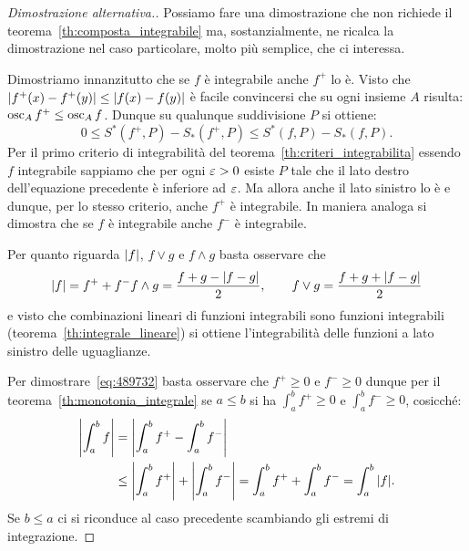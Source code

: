   \begin{proof}[Dimostrazione alternativa.]
  Possiamo fare una dimostrazione che non richiede 
  il teorema~\ref{th:composta_integrabile}
  ma, sostanzialmente, ne ricalca la dimostrazione nel 
  caso particolare, molto più semplice, che ci interessa.

  Dimostriamo innanzitutto che se $f$ è integrabile anche $f^+$ lo è.
  Visto che ${\left|f^+(x)-f^+(y)\right|}\le {\left|f(x)-f(y)\right|}$ 
  è facile convincersi che su ogni insieme $A$ risulta: 
  $\operatorname{osc}_A f^+ \le \operatorname{osc}_A f$.
  Dunque su qualunque suddivisione $P$
  si ottiene:
  \[
    0 \le S^*(f^+,P) - S_*(f^+,P) \le S^*(f,P) - S_*(f,P).
  \]
  Per il primo criterio di integrabilità del 
  teorema~\ref{th:criteri_integrabilita} essendo $f$ integrabile 
  sappiamo che per ogni $\varepsilon>0$ esiste $P$ tale che il lato 
  destro dell'equazione precedente è inferiore ad $\varepsilon$.
  Ma allora anche il lato sinistro lo è e dunque, 
  per lo stesso criterio, anche $f^+$ è integrabile.    
  In maniera analoga si dimostra che se $f$ è integrabile 
  anche $f^-$ è integrabile.
  
  Per quanto riguarda ${\left|f\right|}$, $f\vee g$ e $f\wedge g$  
  basta osservare che%
  \begin{gather*}
    {\left|f\right|} = f^+ + f^-
    f\wedge g = \frac{f + g - {\left|f-g\right|}}{2}, \qquad
    f\vee g = \frac{f+g + {\left|f-g\right|}}{2}
  \end{gather*}
  e visto che combinazioni lineari di funzioni integrabili 
  sono funzioni integrabili (teorema~\ref{th:integrale_lineare})
  si ottiene l'integrabilità delle funzioni a lato sinistro
  delle uguaglianze.
  
  Per dimostrare~\eqref{eq:489732} basta osservare che
  $f^+\ge 0$ e $f^-\ge 0$ dunque per il 
  teorema~\ref{th:monotonia_integrale} 
  se $a\le b$ si ha $\int_a^b f^+\ge 0$ 
  e $\int_a^b f^-\ge 0$, cosicché:
  \begin{align*}
  {\left|\int_a^b f\right|} 
  &= {\left|\int_a^b f^+ - \int_a^b f^-\right|}\\
  &\le {\left|\int_a^b f^+\right|} + {\left|\int_a^b f^-\right|}
  = \int_a^b f^+ + \int_a^b f^-
  = \int_a^b {\left|f\right|}.   
  \end{align*}
  Se $b\le a$ ci si riconduce al caso precedente scambiando 
  gli estremi di integrazione.
  \end{proof}
  
